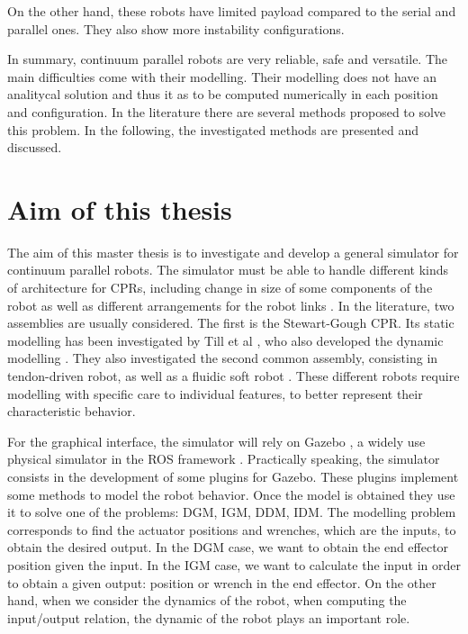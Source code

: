 \documentclass{thesisreport}
\begin{document}
 On the other hand, these robots have limited payload compared to the serial and parallel ones. They also show more instability configurations.
 
 In summary, continuum parallel robots are very reliable, safe and versatile. The main difficulties come with their modelling. Their modelling does not have an analitycal solution and thus it as to be computed numerically in each position and configuration. In the literature there are several methods proposed to solve this problem. In the following, the investigated methods are presented and discussed.
 
 \section{Aim of this thesis}
 The aim of this master thesis is to investigate and develop a general simulator for continuum parallel robots. The simulator must be able to handle different kinds of architecture for CPRs, including change in size of some components of the robot as well as different arrangements for the robot links \cite{bryson_toward_2014}. In the literature, two assemblies are usually considered. The first is the Stewart-Gough CPR. Its static modelling has been investigated by Till et al \cite{till_efficient_2015}\cite{black_parallel_2018}, who also developed the dynamic modelling \cite{till_real-time_2019}. They also investigated the second common assembly, consisting in tendon-driven robot, as well as a fluidic soft robot \cite{till_real-time_2019}. These different robots require modelling with specific care to individual features, to better represent their characteristic behavior. 
 
 For the graphical interface, the simulator will rely on Gazebo \cite{koenig_design_2004}\cite{noauthor_gazebo_nodate}, a widely use physical simulator in the ROS framework \cite{noauthor_rosorg_nodate}. Practically speaking, the simulator consists in the development of some plugins for Gazebo.
 These plugins implement some methods to model the robot behavior. Once the model is obtained they use it to solve one of the problems: DGM, IGM, DDM, IDM.
  The modelling problem corresponds to find the actuator positions and wrenches, which are the inputs, to obtain the desired output. In the DGM case, we want to obtain the end effector position given the input. In the IGM case, we want to calculate the input in order to obtain a given output: position or wrench in the end effector. On the other hand, when we consider the dynamics of the robot, when computing the input/output relation, the dynamic of the robot plays an important role. 
 
\end{document}
